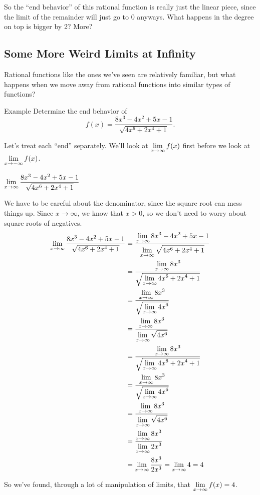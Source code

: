So the ``end behavior'' of this rational function is really just the linear piece, since the limit of the remainder will just go to 0 anyways.
What happens in the degree on top is bigger by 2? More?

\subsection*{Some More Weird Limits at Infinity}

Rational functions like the ones we've seen are relatively familiar, but what happens when we move away from rational functions into similar types of functions?

\begin{note}{Example}
  Determine the end behavior of
  \[f(x) = \frac{8x^3-4x^2+5x-1}{\sqrt{4x^6+2x^4+1}}.\]

  Let's treat each ``end'' separately.
  We'll look at $\displaystyle \lim_{x\to\infty}f(x)$ first before we look at $\displaystyle \lim_{x\to-\infty}f(x)$.

  $\displaystyle \lim_{x\to\infty} \frac{8x^3-4x^2+5x-1}{\sqrt{4x^6+2x^4+1}}$

  We have to be careful about the denominator, since the square root can mess things up.
  Since $x\to\infty$, we know that $x>0$, so we don't need to worry about square roots of negatives.
  \begin{align*}
    \displaystyle \lim_{x\to\infty} \frac{8x^3-4x^2+5x-1}{\sqrt{4x^6+2x^4+1}}&= \frac{\displaystyle \lim_{x\to\infty}8x^3-4x^2+5x-1}{\displaystyle \lim_{x\to\infty}\sqrt{4x^6+2x^4+1}}\\
    & = \frac{\displaystyle \lim_{x\to\infty}8x^3}{\sqrt{\displaystyle \lim_{x\to\infty}4x^6+2x^4+1}}\\
    & =\dfrac{\displaystyle \lim_{x\to\infty}8x^3}{\sqrt{\displaystyle \lim_{x\to\infty}4x^6}}\\
    & = \dfrac{\displaystyle \lim_{x\to\infty}8x^3}{\displaystyle \lim_{x\to\infty}\sqrt{4x^6}}\\
    & = \frac{\displaystyle \lim_{x\to\infty}8x^3}{\sqrt{\displaystyle \lim_{x\to\infty}4x^6+2x^4+1}}\\
    & =\dfrac{\displaystyle \lim_{x\to\infty}8x^3}{\sqrt{\displaystyle \lim_{x\to\infty}4x^6}}\\
    & = \dfrac{\displaystyle \lim_{x\to\infty}8x^3}{\displaystyle \lim_{x\to\infty}\sqrt{4x^6}}\\
    & = \dfrac{\displaystyle \lim_{x\to\infty}8x^3}{\displaystyle \lim_{x\to\infty}2x^3}\\
    & = \displaystyle \lim_{x\to\infty} \dfrac{8x^3}{2x^3} = \displaystyle \lim_{x\to\infty} 4 = 4
  \end{align*}

  So we've found, through a lot of manipulation of limits, that $\displaystyle \lim_{x\to\infty} f(x) = 4$.


\end{note}
